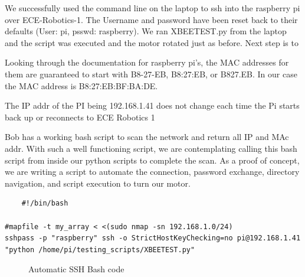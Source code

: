 \documentclass[fontsize=11pt, %
                             paper=letter, %
                             twoside, %
                             captions=tableheading,
                             index=totoc,
                             hyperref]{labbook}
\begin{document}
We successfully used the command line on the laptop to ssh into the raspberry pi over ECE-Robotics-1. The Username and password have been reset back to their defaults (User: pi, psswd: raspberry). We ran XBEETEST.py from the laptop and the script was executed and the motor rotated just as before. Next step is to 

Looking through the documentation for raspberry pi's, the MAC addresses for them are guaranteed to start with B8-27-EB, B8:27:EB, or B827.EB. In our case the MAC address is B8:27:EB:BF:BA:DE.

The IP addr of the PI being 192.168.1.41 does not change each time the Pi starts back up or reconnects to ECE Robotics 1

Bob has a working bash script to scan the network and return all IP and MAc addr. With such a well functioning script, we are contemplating calling this bash script from inside our python scripts to complete the scan. As a proof of concept, we are writing a script to automate the connection, password exchange, directory navigation, and script execution to turn our motor. 
\begin{verbatim}
    #!/bin/bash

#mapfile -t my_array < <(sudo nmap -sn 192.168.1.0/24)
sshpass -p "raspberry" ssh -o StrictHostKeyChecking=no pi@192.168.1.41 "python /home/pi/testing_scripts/XBEETEST.py" 

\end{verbatim}
    
\begin{figure}
  
  \caption{Automatic SSH Bash code}
  \label{fig:BashSSH}
\end{figure}
\end{document}
